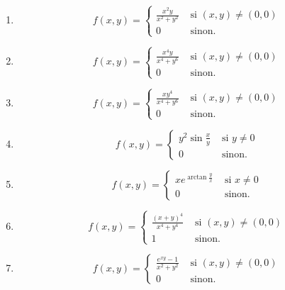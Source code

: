 \documentclass[11pt,a4paper]{article}
\theoremstyle{exostyle}
\begin{document}
\begin{enumerate}	
	
	
	\item $$f(x,y) = \left\{
	\begin{array}{cc}
		\frac{x^2y}{x^2+y^2} & \mbox{ si }(x,y) \neq (0,0) \\
		0 & \mbox{ sinon. }
	\end{array}
	\right .$$
	
	
	\item $$f(x,y) = \left\{
	\begin{array}{cc}
		\frac{x^4y}{x^4+y^6} & \mbox{ si }(x,y) \neq (0,0) \\
		0 & \mbox{ sinon. }
	\end{array}
	\right .$$
	
	\item $$f(x,y) = \left\{
	\begin{array}{cc}
		\frac{xy^4}{x^4+y^6} & \mbox{ si }(x,y) \neq (0,0) \\
		0 & \mbox{ sinon. }
	\end{array}
	\right .$$
	
	\item $$f(x,y) = \left\{
	\begin{array}{cc}
		y^2\sin \frac{x}{y} & \mbox{ si }y \neq 0 \\
		0 & \mbox{ sinon. }
	\end{array}
	\right .$$
	
	\item $$f(x,y) = \left\{
	\begin{array}{cc}
		xe^{\arctan \frac{y}{x}} & \mbox{ si }x \neq 0 \\
		0 & \mbox{ sinon. }
	\end{array}
	\right .$$
		
	\item $$f(x,y) = \left\{
	\begin{array}{cc}
		\frac{(x+y)^4}{x^4+y^4} & \mbox{ si }(x,y) \neq (0,0) \\
		1 & \mbox{ sinon. }
	\end{array}
	\right .$$
	
	
	
	\item $$f(x,y) = \left\{
	\begin{array}{cc}
		\frac{e^{xy}-1}{x^2+y^2} & \mbox{ si }(x,y) \neq (0,0) \\
		0 & \mbox{ sinon. }
	\end{array}
	\right .$$        
\end{enumerate}
\finenonce
\end{document}
